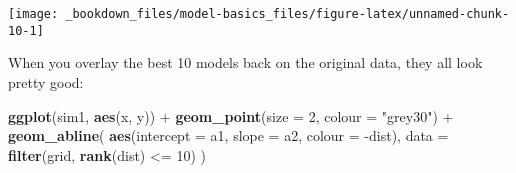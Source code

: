 \documentclass[]{book}
\newenvironment{Shaded}{\begin{snugshade}}{\end{snugshade}}
\newcommand{\KeywordTok}[1]{\textcolor[rgb]{0.13,0.29,0.53}{\textbf{{#1}}}}
\newcommand{\DataTypeTok}[1]{\textcolor[rgb]{0.13,0.29,0.53}{{#1}}}
\newcommand{\DecValTok}[1]{\textcolor[rgb]{0.00,0.00,0.81}{{#1}}}
\newcommand{\StringTok}[1]{\textcolor[rgb]{0.31,0.60,0.02}{{#1}}}
\newcommand{\NormalTok}[1]{{#1}}
\begin{document}
\begin{Shaded}
\end{Shaded}

\begin{center}\texttt{[image: \_bookdown\_files/model-basics\_files/figure-latex/unnamed-chunk-10-1]} \end{center}

When you overlay the best 10 models back on the original data, they all
look pretty good:

\begin{Shaded}
\begin{Highlighting}[]
\KeywordTok{ggplot}\NormalTok{(sim1, }\KeywordTok{aes}\NormalTok{(x, y)) +}\StringTok{ }
\StringTok{  }\KeywordTok{geom_point}\NormalTok{(}\DataTypeTok{size =} \DecValTok{2}\NormalTok{, }\DataTypeTok{colour =} \StringTok{"grey30"}\NormalTok{) +}\StringTok{ }
\StringTok{  }\KeywordTok{geom_abline}\NormalTok{(}
    \KeywordTok{aes}\NormalTok{(}\DataTypeTok{intercept =} \NormalTok{a1, }\DataTypeTok{slope =} \NormalTok{a2, }\DataTypeTok{colour =} \NormalTok{-dist), }
    \DataTypeTok{data =} \KeywordTok{filter}\NormalTok{(grid, }\KeywordTok{rank}\NormalTok{(dist) <=}\StringTok{ }\DecValTok{10}\NormalTok{)}
  \NormalTok{)}
\end{Highlighting}
\end{Shaded}
\end{document}
